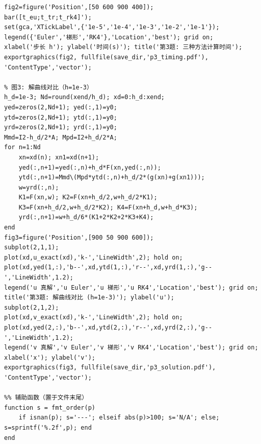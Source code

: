 \documentclass[UTF8,a4paper,11pt]{article}
\begin{document}
\begin{lstlisting}[style=matlab, caption={\texttt{problem3.m}：刚性方程组—— Euler / 隐式梯形 / RK4 比较}]
% 图2: 计算时间条形图
fig2=figure('Position',[50 600 900 400]);
bar([t_eu;t_tr;t_rk4]');
set(gca,'XTickLabel',{'1e-5','1e-4','1e-3','1e-2','1e-1'});
legend({'Euler','梯形','RK4'},'Location','best'); grid on;
xlabel('步长 h'); ylabel('时间(s)'); title('第3题: 三种方法计算时间');
exportgraphics(fig2, fullfile(save_dir,'p3_timing.pdf'), 'ContentType','vector');

% 图3: 解曲线对比（h=1e-3）
h_d=1e-3; Nd=round(xend/h_d); xd=0:h_d:xend;
yed=zeros(2,Nd+1); yed(:,1)=y0;
ytd=zeros(2,Nd+1); ytd(:,1)=y0;
yrd=zeros(2,Nd+1); yrd(:,1)=y0;
Mmd=I2-h_d/2*A; Mpd=I2+h_d/2*A;
for n=1:Nd
    xn=xd(n); xn1=xd(n+1);
    yed(:,n+1)=yed(:,n)+h_d*F(xn,yed(:,n));
    ytd(:,n+1)=Mmd\(Mpd*ytd(:,n)+h_d/2*(g(xn)+g(xn1)));
    w=yrd(:,n);
    K1=F(xn,w); K2=F(xn+h_d/2,w+h_d/2*K1);
    K3=F(xn+h_d/2,w+h_d/2*K2); K4=F(xn+h_d,w+h_d*K3);
    yrd(:,n+1)=w+h_d/6*(K1+2*K2+2*K3+K4);
end
fig3=figure('Position',[900 50 900 600]);
subplot(2,1,1);
plot(xd,u_exact(xd),'k-','LineWidth',2); hold on;
plot(xd,yed(1,:),'b--',xd,ytd(1,:),'r--',xd,yrd(1,:),'g--','LineWidth',1.2);
legend('u 真解','u Euler','u 梯形','u RK4','Location','best'); grid on;
title('第3题: 解曲线对比 (h=1e-3)'); ylabel('u');
subplot(2,1,2);
plot(xd,v_exact(xd),'k-','LineWidth',2); hold on;
plot(xd,yed(2,:),'b--',xd,ytd(2,:),'r--',xd,yrd(2,:),'g--','LineWidth',1.2);
legend('v 真解','v Euler','v 梯形','v RK4','Location','best'); grid on;
xlabel('x'); ylabel('v');
exportgraphics(fig3, fullfile(save_dir,'p3_solution.pdf'), 'ContentType','vector');

%% 辅助函数（置于文件末尾）
function s = fmt_order(p)
    if isnan(p); s='---'; elseif abs(p)>100; s='N/A'; else; s=sprintf('%.2f',p); end
end
\end{lstlisting}
\end{document}
